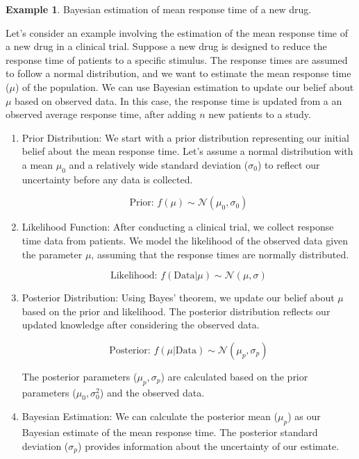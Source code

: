 \documentclass[12pt]{book}
\theoremstyle{definition}
\newtheorem{exmp}{Example}[chapter]
\begin{document}
\begin{tcolorbox}
\begin{exmp}{Bayesian estimation of mean response time of a new drug.}

      Let's consider an example involving the estimation of the mean response time of a new drug in a clinical trial. Suppose a new drug is designed to reduce the response time of patients to a specific stimulus. The response times are assumed to follow a normal distribution, and we want to estimate the mean response time (\(\mu\)) of the population. We can use Bayesian estimation to update our belief about \(\mu\) based on observed data. In this case, the response time is updated from a an observed average response time, after adding \(n\) new patients to a study.
      \end{exmp}
\end{tcolorbox}

     

\begin{enumerate}
    \item Prior Distribution:
   We start with a prior distribution representing our initial belief about the mean response time. Let's assume a normal distribution with a mean \(\mu_0\) and a relatively wide standard deviation (\(\sigma_0\)) to reflect our uncertainty before any data is collected.

   \[ \text{Prior: } f(\mu) \sim \mathcal{N}(\mu_0, \sigma_0) \]

    \item Likelihood Function:
   After conducting a clinical trial, we collect response time data from patients. We model the likelihood of the observed data given the parameter \(\mu\), assuming that the response times are normally distributed.

   \[ \text{Likelihood: } f(\text{Data} | \mu) \sim \mathcal{N}(\mu, \sigma) \]

    \item Posterior Distribution:
   Using Bayes' theorem, we update our belief about \(\mu\) based on the prior and likelihood. The posterior distribution reflects our updated knowledge after considering the observed data.

   \[ \text{Posterior: } f(\mu | \text{Data}) \sim \mathcal{N}(\mu_p, \sigma_p) \]

   The posterior parameters (\(\mu_p, \sigma_p\)) are calculated based on the prior parameters (\(\mu_0, \sigma_0^2\)) and the observed data.

    \item Bayesian Estimation:
   We can calculate the posterior mean (\(\mu_p\)) as our Bayesian estimate of the mean response time. The posterior standard deviation (\(\sigma_p\)) provides information about the uncertainty of our estimate.

\end{enumerate}
\end{document}
